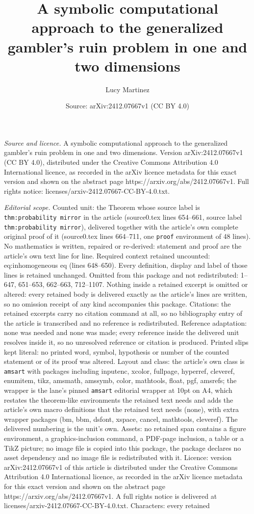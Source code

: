 \documentclass[10pt,a4paper]{amsart}
\title[A symbolic computational approach to the generalized gambler]{A symbolic computational approach to the generalized gambler's ruin problem in one and two dimensions}
\author{Lucy Martinez}
\date{Source: arXiv:2412.07667v1 (CC BY 4.0)}
\begin{document}
\maketitle

\noindent\emph{Source and licence.} A symbolic computational approach to the generalized gambler's ruin problem in one and two dimensions. Version arXiv:2412.07667v1 (CC BY 4.0), distributed under the Creative Commons Attribution 4.0 International licence, as recorded in the arXiv licence metadata for this exact version and shown on the abstract page https://arxiv.org/abs/2412.07667v1. Full rights notice: licenses/arxiv-2412.07667-CC-BY-4.0.txt.\par\smallskip

\noindent\textit{Editorial scope.} Counted unit: the Theorem whose source label is \texttt{thm:probability mirror} in the article (source0.tex lines 654--661, source label \texttt{thm:probability mirror}), delivered together with the article's own complete original proof of it (source0.tex lines 664--711, one \texttt{proof} environment of 48 lines). No mathematics is written, repaired or re-derived: statement and proof are the article's own text line for line. Required context retained uncounted: eq:inhomogeneous eq (lines 648--650). Every definition, display and label of those lines is retained unchanged. Omitted from this package and not redistributed: 1--647, 651--653, 662--663, 712--1107. Nothing inside a retained excerpt is omitted or altered: every retained body is delivered exactly as the article's lines are written, so no omission receipt of any kind accompanies this package. Citations: the retained excerpts carry no citation command at all, so no bibliography entry of the article is transcribed and no reference is redistributed. Reference adaptation: none was needed and none was made; every reference inside the delivered unit resolves inside it, so no unresolved reference or citation is produced. Printed slips kept literal: no printed word, symbol, hypothesis or number of the counted statement or of its proof was altered. Layout and class: the article's own class is \texttt{amsart} with packages including inputenc, xcolor, fullpage, hyperref, cleveref, enumitem, tikz, amsmath, amssymb, color, mathtools, float, pgf, amsrefs; the wrapper is the lane's pinned \texttt{amsart} editorial wrapper at 10pt on A4, which restates the theorem-like environments the retained text needs and adds the article's own macro definitions that the retained text needs (none), with extra wrapper packages (bm, bbm, dsfont, xspace, cancel, mathtools, cleveref). The delivered numbering is the unit's own. Assets: no retained span contains a figure environment, a graphics-inclusion command, a PDF-page inclusion, a table or a TikZ picture; no image file is copied into this package, the package declares no asset dependency and no image file is redistributed with it. Licence: version arXiv:2412.07667v1 of this article is distributed under the Creative Commons Attribution 4.0 International licence, as recorded in the arXiv licence metadata for this exact version and shown on the abstract page https://arxiv.org/abs/2412.07667v1. A full rights notice is delivered at licenses/arxiv-2412.07667-CC-BY-4.0.txt. Characters: every retained 
\end{document}
